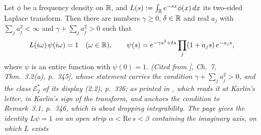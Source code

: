 \begin{theorem}
\label{thm:cited-A24}
\leanok
Let $\phi$ be a \Polya{} frequency density on $\mathbb{R}$, and $L(s) := \int_{\mathbb{R}}e^{-sx}\phi(x)\,dx$ its
two-sided Laplace transform. Then there are numbers $\gamma \ge 0$, $\delta \in \mathbb{R}$ and real $a_j$
with $\sum_j a_j^2 < \infty$ and $\gamma + \sum_j a_j^2 > 0$ such that
\[
  L(i\omega)\,\psi(i\omega) = 1 \quad (\omega \in \mathbb{R}), \qquad
  \psi(s) = e^{-\gamma s^2 + \delta s}\prod_j(1 + a_j s)\,e^{-a_j s},
\]
where $\psi$ is an entire function with $\psi(0) = 1$.
\statusA\quad{}\quad\emph{(Cited from [, Ch.~7, Thm.~3.2(a),
p.~345], whose statement carries the condition $\gamma + \sum_ja_j^2 > 0$, and the class
$\mathcal{E}_2^*$ of its display (2.2), p.~336; as printed in
, which reads it at Karlin's letter, in Karlin's sign of
the transform, and anchors the condition to Remark~3.1, p.~346, which is about dropping
integrability. The page gives the identity $L\psi = 1$ on an open strip
$\alpha < \mathrm{Re}\,s < \beta$ containing the imaginary axis, on which $L$ exists
}
\end{theorem}
